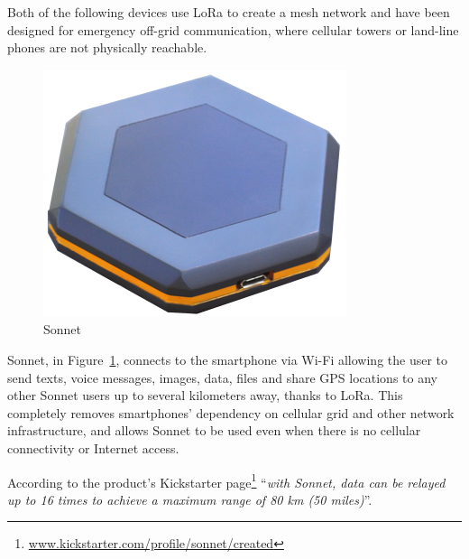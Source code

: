 				Both of the following devices use LoRa to create a mesh network and have been designed for emergency off-grid communication, where cellular towers or land-line phones are not physically reachable.
				
				\begin{minipage}{0.38\textwidth}%
					\begin{figure}[H]
						\centering
						\includegraphics[width=.8\textwidth]{resources/img/chap4/sonnet}
						\caption{Sonnet}
						\label{img:sonnet}
					\end{figure}
				\end{minipage}%
				\hfill%
				\begin{minipage}{0.62\textwidth}\raggedright
					Sonnet\footnotemark, in Figure~\ref{img:sonnet}, connects to the smartphone via Wi-Fi allowing the user to send texts, voice messages, images, data, files and share GPS locations to any other Sonnet users up to several kilometers away, thanks to LoRa.
					This completely removes smartphones' dependency on cellular grid and other network infrastructure, and allows Sonnet to be used even when there is no cellular connectivity or Internet access.
				\end{minipage}		
			
				According to the product's Kickstarter page\footnote{ \url{www.kickstarter.com/profile/sonnet/created}} ``\textit{with Sonnet, data can be relayed up to 16 times to achieve a maximum range of 80 km (50 miles)}''.

